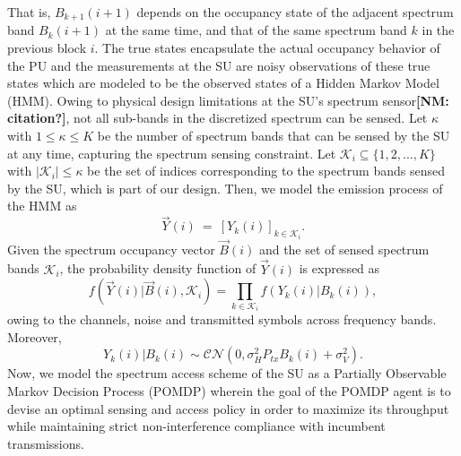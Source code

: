 \documentclass[10pt,twocolumn]{IEEEtran}
\newcommand{\nm}[1]{{\color{blue}\bf{[NM: #1]}}}
\begin{document}
That is, $B_{k+1}(i+1)$ depends on the  occupancy state of the adjacent spectrum band $B_{k}(i+1)$ at the same time, and that of the same spectrum band $k$ in the previous block $i$. The true states encapsulate the actual occupancy behavior of the PU and the measurements at the SU are noisy observations of these true states which are modeled to be the observed states of a Hidden Markov Model (HMM). Owing to physical design limitations at the SU's spectrum sensor\nm{citation?}, not all sub-bands in the discretized spectrum can be sensed. Let $\kappa$ with $1\leq \kappa\leq K$ be the number of spectrum bands that can be sensed by the SU at any time, capturing the spectrum sensing constraint. Let $\mathcal K_{i}\subseteq\{1,2,\dots,K\}$ with $|\mathcal K_i|\leq \kappa$ be the set of indices corresponding to the spectrum bands sensed by the SU, which is part of our design. Then, we model the emission process of the HMM as
\begin{equation}\label{8}
    \vec{Y}(i)\ =\ [Y_k(i)]_{k\in\mathcal K_i}.
\end{equation}
Given the spectrum occupancy vector $\vec{B}(i)$ and the set of sensed spectrum bands $\mathcal K_i$, the probability density function of $\vec{Y}(i)$ is expressed as
\begin{equation}\label{9}
    f(\vec{Y}(i)|\vec{B}(i),\mathcal K_i)=\prod_{k\in\mathcal K_i}f(Y_k(i)|B_k(i)),
\end{equation}
owing to the channels, noise and transmitted symbols across frequency bands. Moreover,
\begin{equation}\label{10}
 Y_k(i)|B_k(i)\sim \mathcal{CN}(0,\sigma_H^2P_{tx}B_k(i)+\sigma_V^2).
\end{equation}
Now, we model the spectrum access scheme of the SU as a Partially Observable Markov Decision Process (POMDP) wherein the goal of the POMDP agent is to devise an optimal sensing and access policy in order to maximize its throughput while maintaining strict non-interference compliance with incumbent transmissions.
\end{document}
